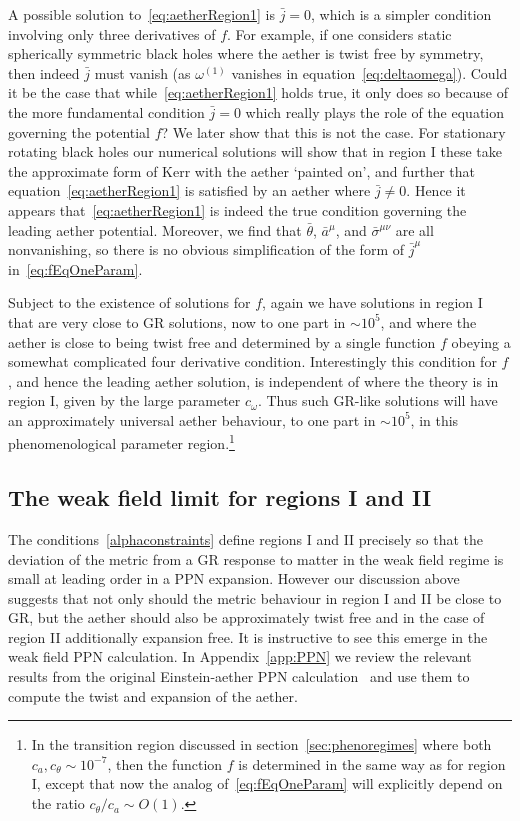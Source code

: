 \documentclass[12pt]{article}
\numberwithin{equation}{section}
\begin{document}
A possible solution to~\eqref{eq:aetherRegion1} is $\bar{j} = 0$, which is a simpler condition  involving only three derivatives of $f$. For example, if one considers static spherically symmetric black holes where the aether is twist free by symmetry, then indeed $\bar{j}$ must vanish (as $\omega^{(1)}$ vanishes in equation~\eqref{eq:deltaomega}). 
%
Could it be the case that while~\eqref{eq:aetherRegion1} holds true, it only does so because of the more fundamental condition $\bar{j} = 0$ which really plays the role of the equation governing the potential $f$?
%
We later show that this is not the case. For stationary rotating black holes our numerical solutions will show that in region I these take the approximate form of Kerr with the aether `painted on', and further that equation~\eqref{eq:aetherRegion1} is satisfied by an aether where $\bar{j} \ne 0$. Hence it appears that~\eqref{eq:aetherRegion1} is indeed the true condition governing the leading aether potential.
Moreover, we find that $\bar{\theta}$, $\bar{a}^\mu$, and $\bar{\sigma}^{\mu\nu}$ are
all nonvanishing, so there is no obvious simplification of the
form of $\bar{j}^\mu$ in~\eqref{eq:fEqOneParam}.

Subject to the existence of solutions for $f$, again we have solutions in region I that are very close to GR solutions, 
now to one part in $\sim 10^{5}$, and where the aether is close to being twist free and determined by a single function $f$ obeying a somewhat complicated four derivative condition. Interestingly this condition for $f$, and hence the leading aether solution, is independent of where the theory is in region I, given by the large parameter $c_\omega$.
Thus such GR-like solutions will have an approximately universal aether behaviour, to one part in $\sim 10^{5}$, 
in this phenomenological parameter region.\footnote{
In the transition region discussed in section~\ref{sec:phenoregimes} where both $c_a, c_\theta \sim 10^{-7}$, then the function $f$ is determined in the same way as for region I, except that now the analog of~\eqref{eq:fEqOneParam} will explicitly depend on the ratio $c_\theta/c_{a} \sim O(1)$.
}



\subsection{The weak field limit for regions I and II}

The conditions~\eqref{alphaconstraints} define regions I and II precisely so that the deviation of the metric from a GR response to matter in the weak field regime is small at leading order in a PPN expansion. However our discussion above suggests that not only should the metric behaviour in region I and II be close to GR, but the aether should also be approximately twist free and in the case of region II additionally expansion free. It is instructive to see this emerge in the weak field PPN calculation.  In Appendix~\ref{app:PPN} we review the relevant results from the original Einstein-aether PPN calculation~\cite{Foster:2005dk} and use them to compute the twist and expansion of the aether. 
\end{document}

